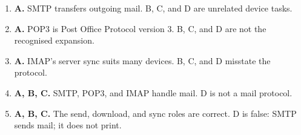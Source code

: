\documentclass[11pt]{article}
\begin{document}
\begin{enumerate}[label=\textbf{Q\arabic*.}, leftmargin=*]
\item \textbf{A.} SMTP transfers outgoing mail. B, C, and D are unrelated device tasks.
\item \textbf{A.} POP3 is Post Office Protocol version 3. B, C, and D are not the recognised expansion.
\item \textbf{A.} IMAP's server sync suits many devices. B, C, and D misstate the protocol.
\item \textbf{A, B, C.} SMTP, POP3, and IMAP handle mail. D is not a mail protocol.
\item \textbf{A, B, C.} The send, download, and sync roles are correct. D is false: SMTP sends mail; it does not print.
\end{enumerate}
\def\JKSSBLessonID{38}\def\JKSSBAnswers{1}
\end{document}
